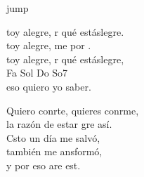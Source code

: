 \begin{cancion}jump\\
	\begin{chorus}%
		toy alegre, r qué estáslegre.\\
		toy alegre, me por . \\
		toy alegre, r qué estáslegre,\\
	 Fa      Sol    Do  So7\\
	eso quiero yo saber.\jump\\
	\end{chorus}%
	Quiero conrte, quieres conrme,\\
	la razón de estar gre así.\\
	\jump
	Csto un día me salvó,\\
	también me ansformó,\\
	y por eso are est.\\
\end{cancion}%
